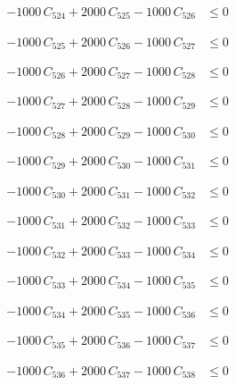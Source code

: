 \documentclass[a4paper,11pt]{article}
\begin{document}
\begin{align}
-1000\,C_{524} + 2000\,C_{525} - 1000\,C_{526} &\leq 0 \nonumber
\end{align}

\begin{align}
-1000\,C_{525} + 2000\,C_{526} - 1000\,C_{527} &\leq 0 \nonumber
\end{align}

\begin{align}
-1000\,C_{526} + 2000\,C_{527} - 1000\,C_{528} &\leq 0 \nonumber
\end{align}

\begin{align}
-1000\,C_{527} + 2000\,C_{528} - 1000\,C_{529} &\leq 0 \nonumber
\end{align}

\begin{align}
-1000\,C_{528} + 2000\,C_{529} - 1000\,C_{530} &\leq 0 \nonumber
\end{align}

\begin{align}
-1000\,C_{529} + 2000\,C_{530} - 1000\,C_{531} &\leq 0 \nonumber
\end{align}

\begin{align}
-1000\,C_{530} + 2000\,C_{531} - 1000\,C_{532} &\leq 0 \nonumber
\end{align}

\begin{align}
-1000\,C_{531} + 2000\,C_{532} - 1000\,C_{533} &\leq 0 \nonumber
\end{align}

\begin{align}
-1000\,C_{532} + 2000\,C_{533} - 1000\,C_{534} &\leq 0 \nonumber
\end{align}

\begin{align}
-1000\,C_{533} + 2000\,C_{534} - 1000\,C_{535} &\leq 0 \nonumber
\end{align}

\begin{align}
-1000\,C_{534} + 2000\,C_{535} - 1000\,C_{536} &\leq 0 \nonumber
\end{align}

\begin{align}
-1000\,C_{535} + 2000\,C_{536} - 1000\,C_{537} &\leq 0 \nonumber
\end{align}

\begin{align}
-1000\,C_{536} + 2000\,C_{537} - 1000\,C_{538} &\leq 0 \nonumber
\end{align}
\end{document}
